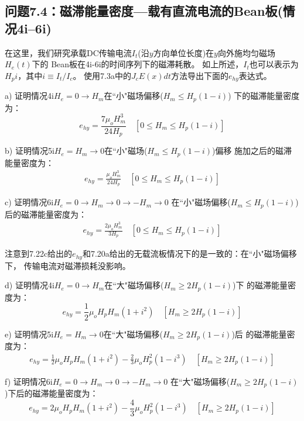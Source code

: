 \subsection{问题7.4：磁滞能量密度---载有直流电流的Bean板(情况4i--6i)}
在这里，我们研究承载DC传输电流$I_t$(沿$y$方向单位长度)在$y$向外施均匀磁场$H_e(t)$下的
Bean板在4i-6i的时间序列下的磁滞耗散。
如上所述，$I_t$也可以表示为$H_pi$，其中$i\equiv I_t/ I_c$。
使用7.3a中的$J_c E(x)dt$方法导出下面的$e_{hy}$表达式。

a) 证明情况4i$H_e=0\rightarrow H_m$在``小"磁场偏移($H_m\le H_p(1-i)$)
下的磁滞能量密度为：
\begin{equation}%
e_{hy}=\frac{7\mu_oH_{m}^{3}}{24H_p} \quad  [0\leq H_m\leq H_p(1-i)]
\end{equation}

b) 证明情况5i$H_e=H_m\rightarrow 0$在``小"磁场($H_m\le H_p(1-i)$)偏移
施加之后的磁滞能量密度为：
\begin{align*}%
e_{hy}=\frac{\mu_oH_{m}^{3}}{24H_p} \quad   [0\leq H_m\leq H_p(1-i)] \tag{7.22b}
\end{align*}

c) 证明情况6i$H_e=0\rightarrow H_m\rightarrow 0\rightarrow -H_m\rightarrow 0$
在``小"磁场偏移($H_m\le H_p(1-i)$)后的磁滞能量密度为：
\begin{align*}%
e_{hy}=\frac{2\mu_oH_{m}^{3}}{3H_p} \quad  [0\leq H_m\leq H_p(1-i)] \tag{7.22c}
\end{align*}

注意到7.22c给出的$e_{hy}$和7.20a给出的无载流板情况下的是一致的：在``小"磁场偏移下，
传输电流对磁滞损耗没影响。

d) 证明情况4i$H_e=0\rightarrow H_m$在``大"磁场偏移($H_m\ge 2H_p(1-i)$)下
的磁滞能量密度为：
\begin{equation}%
e_{hy}=\frac{1}{2}\mu_oH_pH_m(1+i^2) \quad [H_m\geq2H_p(1-i)]
\end{equation}

e) 证明情况5i$H_e=H_m\rightarrow 0$在``大"磁场偏移($H_m\ge 2H_p(1-i)$)后
的磁滞能量密度为：
\begin{align*}%
e_{hy}=\frac{1}{2}\mu_oH_pH_m(1+i^2)-\frac{2}{3}\mu_oH_{p}^{2}(1-i^3) \quad [H_m\geq2H_p(1-i)]\tag{7.23b}
\end{align*}

f) 证明情况6i$H_e=0\rightarrow H_m\rightarrow 0\rightarrow -H_m\rightarrow 0$
在``大"磁场偏移($H_m\ge 2H_p(1-i)$)下后的磁滞能量密度为：
\begin{equation}%
e_{hy}=2\mu_oH_pH_m(1+i^2)-\frac{4}{3}\mu_oH_{p}^{2}(1-i^3)\quad  [H_m\geq2H_p(1-i)] \tag{7.23c}
\end{equation}

